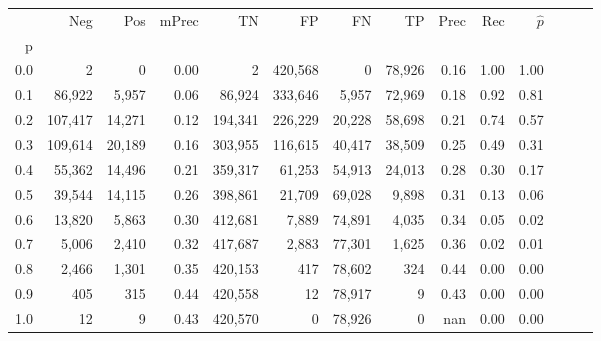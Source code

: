 \begin{tabular}{rrrrrrrrrrrrrr}
\toprule
{} &      Neg &     Pos & mPrec &       TN &       FP &      FN &      TP &  Prec &   Rec & $\hat{p}$ \\
p   &          &         &       &          &          &         &         &       &       &           \\
\midrule
0.0 &        2 &       0 &  0.00 &        2 &  420,568 &       0 &  78,926 &  0.16 &  1.00 &      1.00 \\
0.1 &   86,922 &   5,957 &  0.06 &   86,924 &  333,646 &   5,957 &  72,969 &  0.18 &  0.92 &      0.81 \\
0.2 &  107,417 &  14,271 &  0.12 &  194,341 &  226,229 &  20,228 &  58,698 &  0.21 &  0.74 &      0.57 \\
0.3 &  109,614 &  20,189 &  0.16 &  303,955 &  116,615 &  40,417 &  38,509 &  0.25 &  0.49 &      0.31 \\
0.4 &   55,362 &  14,496 &  0.21 &  359,317 &   61,253 &  54,913 &  24,013 &  0.28 &  0.30 &      0.17 \\
0.5 &   39,544 &  14,115 &  0.26 &  398,861 &   21,709 &  69,028 &   9,898 &  0.31 &  0.13 &      0.06 \\
0.6 &   13,820 &   5,863 &  0.30 &  412,681 &    7,889 &  74,891 &   4,035 &  0.34 &  0.05 &      0.02 \\
0.7 &    5,006 &   2,410 &  0.32 &  417,687 &    2,883 &  77,301 &   1,625 &  0.36 &  0.02 &      0.01 \\
0.8 &    2,466 &   1,301 &  0.35 &  420,153 &      417 &  78,602 &     324 &  0.44 &  0.00 &      0.00 \\
0.9 &      405 &     315 &  0.44 &  420,558 &       12 &  78,917 &       9 &  0.43 &  0.00 &      0.00 \\
1.0 &       12 &       9 &  0.43 &  420,570 &        0 &  78,926 &       0 &   nan &  0.00 &      0.00 \\
\bottomrule
\end{tabular}
